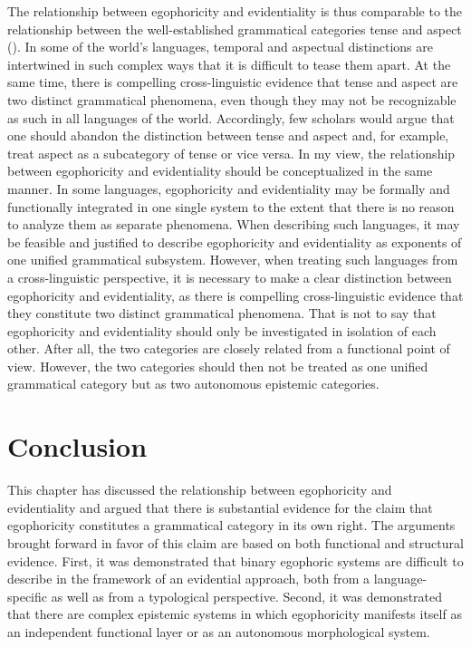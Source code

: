 \documentclass[output=paper]{langsci/langscibook}
\begin{document}
The relationship between egophoricity and evidentiality is thus comparable to the relationship between the well-established grammatical categories tense and aspect (\citealt[299]{Widmer2017b}). In some of the world’s languages, temporal and aspectual distinctions are intertwined in such complex ways that it is difficult to tease them apart. At the same time, there is compelling cross-linguistic evidence that tense and aspect are two distinct grammatical phenomena, even though they may not be recognizable as such in all languages of the world. Accordingly, few scholars would argue that one should abandon the distinction between tense and aspect and, for example, treat aspect as a subcategory of tense or vice versa. In my view, the relationship between egophoricity and evidentiality should be conceptualized in the same manner. In some languages, egophoricity and evidentiality may be formally and functionally integrated in one single system to the extent that there is no reason to analyze them as separate phenomena. When describing such languages, it may be feasible and justified to describe egophoricity and evidentiality as exponents of one unified grammatical subsystem. However, when treating such languages from a cross-linguistic perspective, it is necessary to make a clear distinction between egophoricity and evidentiality, as there is compelling cross-linguistic evidence that they constitute two distinct grammatical phenomena. That is not to say that egophoricity and evidentiality should only be investigated in isolation of each other. After all, the two categories are closely related from a functional point of view. However, the two categories should then not be treated as one unified grammatical category but as two autonomous epistemic categories.

\section{Conclusion}\label{s:mw6}

This chapter has discussed the relationship between egophoricity and evidentiality and argued that there is substantial evidence for the claim that egophoricity constitutes a grammatical category in its own right. The arguments brought forward in favor of this claim are based on both functional and structural evidence. First, it was demonstrated that binary egophoric systems are difficult to describe in the framework of an evidential approach, both from a language-specific as well as from a typological perspective. Second, it was demonstrated that there are complex epistemic systems in which egophoricity manifests itself as an independent functional layer or as an autonomous morphological system. 
\end{document}
